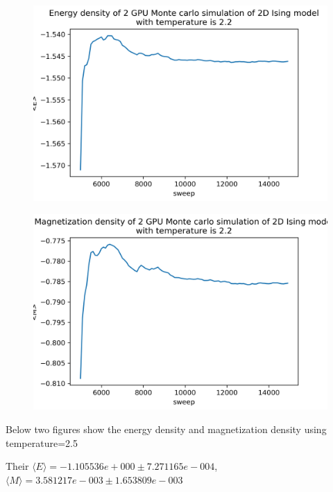 \documentclass{article}
\begin{document}
	\begin{figure}[hb!]
		\centering
		\includegraphics[width=0.9\linewidth]{notebook/2gpu_2.2_E}
	\end{figure}
	\begin{figure}[hb!]
		\centering
		\includegraphics[width=0.9\linewidth]{notebook/2gpu_2.2_M}
	\end{figure}
	
	Below two figures show the energy density and magnetization density using temperature=2.5

	Their $\langle E\rangle = -1.105536e+000 \pm 7.271165e-004$, $\langle M\rangle = 3.581217e-003 \pm 1.653809e-003$
\end{document}
